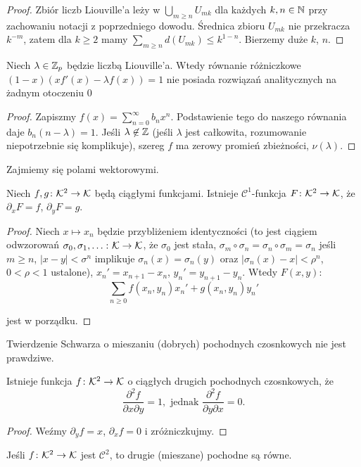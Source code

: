 \begin{proof}
	Zbiór liczb Liouville'a leży w $\bigcup_{m \ge n} U_{mk}$ dla każdych $k, n \in \mathbb N$ przy zachowaniu notacji z poprzedniego dowodu.
	Średnica zbioru $U_{mk}$ nie przekracza $k^{-m}$, zatem dla $k \ge 2$ mamy $\sum_{m \ge n} d(U_{mk}) \le k^{1-n}$.
	Bierzemy duże $k$, $n$.
\end{proof}

\begin{fakt}
	Niech $\lambda \in \mathbb Z_p$ będzie liczbą Liouville'a.
	Wtedy równanie różniczkowe $(1-x)(x f'(x) - \lambda f(x)) = 1$ nie posiada rozwiązań analitycznych na żadnym otoczeniu $0$ 
\end{fakt}

\begin{proof}
	Zapiszmy $f(x) = \sum_{n=0}^\infty b_n x^n$.
	Podstawienie tego do naszego równania daje $b_n (n - \lambda ) = 1$.
	Jeśli $\lambda \not \in \mathbb Z$ (jeśli $\lambda$ jest całkowita, rozumowanie niepotrzebnie się komplikuje), szereg $f$ ma zerowy promień zbieżności, $\nu(\lambda)$.
\end{proof}

Zajmiemy się polami wektorowymi.

\begin{fakt}
	Niech $f, g \colon \mathcal K^2 \to \mathcal K$ będą ciągłymi funkcjami.
	Istnieje $\mathcal C^1$-funkcja $F \colon \mathcal K^2 \to \mathcal K$, że $\partial_x F = f$, $\partial_y F = g$.
\end{fakt}

\begin{proof}
	Niech $x \mapsto x_n$ będzie przybliżeniem identyczności (to jest ciągiem odwzorowań $\sigma_0, \sigma_1, \ldots \colon \mathcal K \to \mathcal K$, że $\sigma_0$ jest stała, $\sigma_m \circ \sigma_n = \sigma_n \circ \sigma_m = \sigma_n$ jeśli $m \ge n$, $|x - y| < \sigma^n$ implikuje $\sigma_n(x) = \sigma_n(y)$ oraz $|\sigma_n(x) - x| < \rho^n$, $0 < \rho < 1$ ustalone), $x_n' = x_{n+1} - x_n$, $y_n' = y_{n+1} - y_n$. 
	Wtedy $F(x, y)$:
	\[
		\sum_{n \ge 0} f(x_n, y_n)x_n' +g(x_n, y_n)y_n'
	\]

	jest w porządku.
\end{proof}

Twierdzenie Schwarza o mieszaniu (dobrych) pochodnych czosnkowych nie jest prawdziwe.

\begin{wniosek}
	Istnieje funkcja $f \colon \mathcal K^2 \to \mathcal K$ o ciągłych drugich pochodnych czosnkowych, że
	\[
		\frac{\partial^2 f}{\partial x \partial y} = 1, \mbox{ jednak }
		\frac{\partial^2 f}{\partial y \partial x} = 0.
	\]
\end{wniosek}

\begin{proof}
	Weźmy $\partial_y f = x$, $\partial_xf = 0$ i zróżniczkujmy.
\end{proof}

\begin{fakt}
	Jeśli $f \colon \mathcal K^2 \to \mathcal K$ jest $\mathcal C^2$, to drugie (mieszane) pochodne są równe.
\end{fakt}